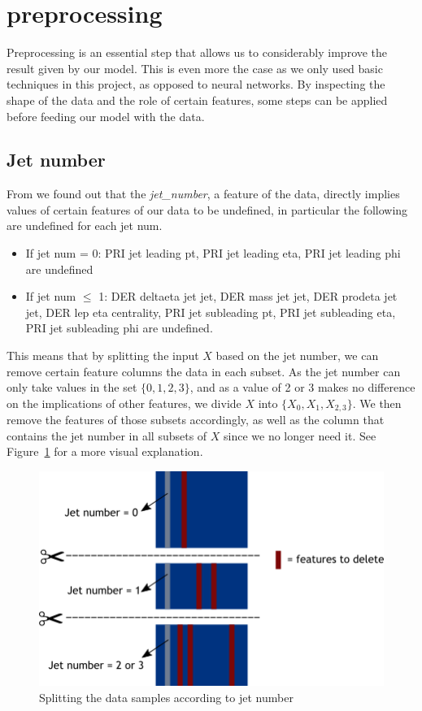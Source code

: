 \documentclass[10pt,conference,compsocconf]{IEEEtran}
\begin{document}
\section{preprocessing}

\label{sec:preprocessing}
Preprocessing is an essential step that allows us to considerably improve the result given by our model. This is even more the case as we only used basic techniques in this project, as opposed to neural networks. By inspecting the shape of the data and the role of certain features, some steps can be applied before feeding our model with the data.

\subsection{Jet number}

From \cite{higgsPaper} we found out that the \textit{jet\_number}, a feature of the data, directly implies values of certain features of our data to be undefined, in particular the following are undefined for each jet num.

\begin{itemize}
  \item If jet num = 0: PRI jet leading pt, PRI jet leading eta, PRI jet leading phi are undefined
  \item If jet num $\leq$ 1: DER deltaeta jet jet, DER mass jet jet, DER prodeta jet jet, DER lep eta centrality, PRI jet subleading pt, PRI jet subleading eta, PRI jet subleading phi are undefined.
\end{itemize}

This means that by splitting the input $X$ based on the jet number, we can remove certain feature columns the data in each subset. As the jet number can only take values in the set $\{0,1,2,3\}$, and as a value of 2 or 3 makes no difference on the implications of other features, we divide $X$ into $\{X_0,X_1,X_{2,3}\}$. We then remove the features of those subsets accordingly, as well as the column that contains the jet number in all subsets of $X$ since we no longer need it. See Figure~\ref{fig:jet-split} for a more visual explanation.

\begin{figure}[h]
  \centering
  \includegraphics[width=\columnwidth]{jets.png}
  \caption{Splitting the data samples according to jet number}
  \vspace{-3mm}
  \label{fig:jet-split}
\end{figure}
\end{document}
